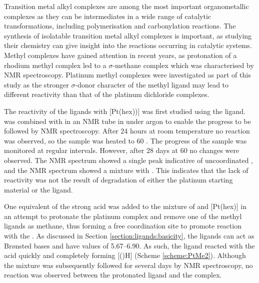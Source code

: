 Transition metal alkyl complexes are among the most important organometallic complexes as they can be intermediates in a wide range of catalytic transformations, including polymerisation and carbonylation reactions.\cite{Doherty1999, Veen2002}  The synthesis of isolatable transition metal alkyl complexes is important, as studying their chemistry can give insight into the reactions occurring in catalytic systems.\cite{Moss1996}  Methyl complexes have gained attention in recent years, as protonation of a rho\-dium methyl complex led to a $\sigma$-methane complex which was characterised by NMR spectroscopy.\cite{Bernskoetter2009}  Platinum methyl complexes were investigated as part of this study as the stronger $\sigma$-donor character of the methyl ligand may lead to different reactivity than that of the platinum dichloride complexes.\cite{Appleton1978}

The reactivity of the \tBuxantphos{} ligands with [Pt(\acrshort{hex}))] was first studied using the \tButhixantphos{} ligand.  \tBuThixantphos{} was combined with  in an NMR tube in  under argon to enable the progress to be followed by NMR spectroscopy.  After 24 hours at room temperature no reaction was observed, so the sample was heated to 60 \degC.  The progress of the sample was monitored at regular intervals.  However, after 28 days at 60 \degC{} no changes were observed.  The \phosphorus{} NMR spectrum showed a single peak indicative of uncoordinated \tButhixantphos{}, and the \proton{} NMR spectrum showed a mixture with .  This indicates that the lack of reactivity was not the result of degradation of either the platinum starting material or the \tButhixantphos{} ligand.  

One equivalent of the strong acid  was added to the mixture of \tButhixantphos{} and [Pt(\acrshort{hex})] in an attempt to protonate the platinum complex and remove one of the methyl ligands as methane, thus forming a free coordination site to promote reaction with the \tButhixantphos.  As discussed in Section \ref{section:ligands:basicity}, the \tBuxantphos{} ligands can act as Br\o{}nsted bases and have \pKb{} values of 5.67--6.90.  As such, the \tButhixantphos{} ligand reacted with the acid quickly and completely forming [(\tButhixantphos)H] (Scheme \ref{scheme:PtMe2}).  Although the mixture was subsequently followed for several days by NMR spectroscopy, no reaction was observed between the protonated \tButhixantphos{} ligand and the  complex.  

